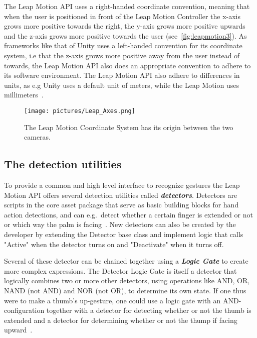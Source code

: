 The Leap Motion API uses a right-handed coordinate convention, meaning that when the user is positioned in front of the Leap Motion Controller the x-axis grows more positive 
towards the right, the y-axis grows more positive upwards and the z-axis grows more positive towards the user (see~\vref{fig:leapmotion3}). 
As frameworks like that of Unity uses a left-handed convention for its coordinate system, i.e that the z-axis grows more positive away from the 
user instead of towards, the Leap Motion API also does an appropriate convention to adhere to its software environment. 
The Leap Motion API also adhere to differences in units, as e.g Unity uses a default unit of meters, while the Leap Motion uses millimeters~\citep{LeapMotion2016}.

\begin{figure}%
	\texttt{[image: pictures/Leap\_Axes.png]}
	\caption[Leap Motion Coordinates]{The Leap Motion Coordinate System has its origin between the two cameras.}
	\label{fig:leapmotion3}
\end{figure} 

\subsection{The detection utilities}
To provide a common and high level interface to recognize gestures the Leap Motion API offers several detection utilities called \textbf{\textit{detectors}}.
Detectors are scripts in the core asset package that serve as basic building blocks for hand action detections, and can e.g.~detect whether a certain finger is extended or not
or which way the palm is facing~\citep{LeapMotion2016}. New detectors can also be created by the developer by extending
the Detector base class and implement logic that calls "Active" when the detector turns on and "Deactivate" when it turns off.

Several of these detector can be chained together using a \textbf{\textit{Logic Gate}} to create more complex expressions. 
The Detector Logic Gate is itself a detector that logically combines two or more other detectors, using operations like AND, OR, NAND (not AND) and NOR (not OR), 
to determine its own state.
If one thus were to make a thumb's up-gesture, one could use a logic gate with an AND-configuration together with a detector for detecting whether or not the
thumb is extended and a detector for determining whether or not the thump if facing upward~\citep{LeapMotion2016}. 

